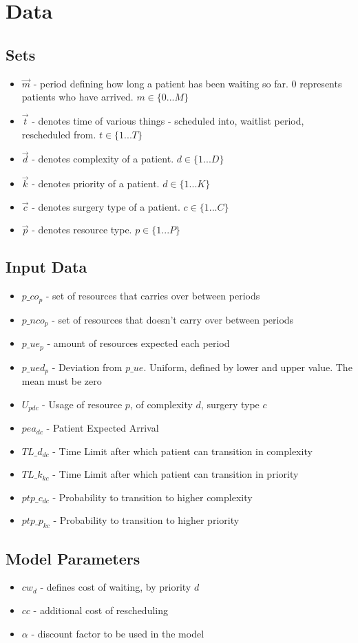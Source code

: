 \section{Data}

\subsection{Sets}
\begin{itemize}
	\item $\vec{m}$ - 
		period defining how long a patient has been waiting so far. 0 represents patients who have arrived. 
		$m \in \{0 ... M\}$
	\item $\vec{t}$ - 
		denotes time of various things - scheduled into, waitlist period, rescheduled from. 
		$t \in \{1 ... T\}$
	\item $\vec{d}$ - 
		denotes complexity of a patient. 
		$d \in \{ 1 ... D \}$
	\item $\vec{k}$ - 
		denotes priority of a patient. 
		$d \in \{ 1 ... K \}$
	\item $\vec{c}$ - 
		denotes surgery type of a patient. 
		$c \in \{ 1 ... C \}$
	\item $\vec{p}$ - 
		denotes resource type. 
		$p \in \{ 1 ... P \}$
\end{itemize}

\subsection{Input Data}
\begin{itemize}
	\item $p\_co_{p}$ - set of resources that carries over between periods
	\item $p\_nco_{p}$ - set of resources that doesn't carry over between periods
	\item $p\_ue_{p}$ - amount of resources expected each period
	\item $p\_ued_{p}$ - Deviation from $p\_ue$. Uniform, defined by lower and upper value. The mean must be zero
	\item $U_{pdc}$ - Usage of resource $p$, of complexity $d$, surgery type $c$
	\item $pea_{dc}$ - Patient Expected Arrival
	\item $TL\_d_{dc}$ - Time Limit after which patient can transition in complexity
	\item $TL\_k_{kc}$ - Time Limit after which patient can transition in priority
	\item $ptp\_c_{dc}$ - Probability to transition to higher complexity
	\item $ptp\_p_{kc}$ - Probability to transition to higher priority
\end{itemize}

\subsection{Model Parameters}
\begin{itemize}
	\item $cw_{d}$ - defines cost of waiting, by priority $d$
	\item $cc$ - additional cost of rescheduling 
	\item $\alpha$ - discount factor to be used in the model
\end{itemize}